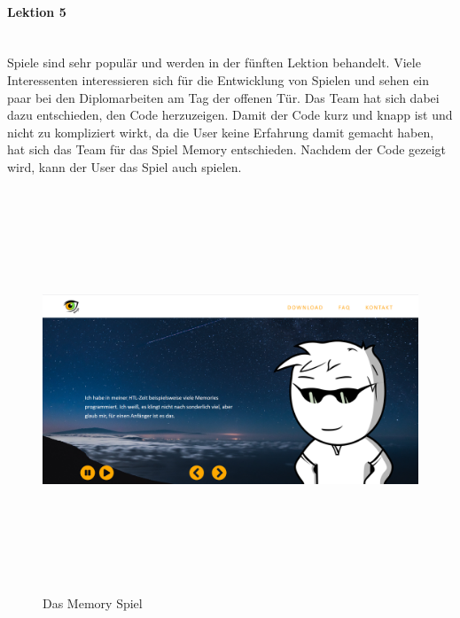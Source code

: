 \paragraph{Lektion 5} \leavevmode \\
Spiele sind sehr populär und werden in der fünften Lektion behandelt. Viele Interessenten interessieren sich für die Entwicklung von Spielen und sehen ein paar bei den Diplomarbeiten am Tag der offenen Tür. Das Team hat sich dabei dazu entschieden, den Code herzuzeigen. Damit der Code kurz und knapp ist und nicht zu kompliziert wirkt, da die User keine Erfahrung damit gemacht haben, hat sich das Team für das Spiel Memory entschieden. Nachdem der Code gezeigt wird, kann der User das Spiel auch spielen.
\begin{figure} [h]
	\centering
\includegraphics[width=12cm,height=12cm,keepaspectratio]{webseite_abb16} 
	\caption{Das Memory Spiel}
\end{figure}
